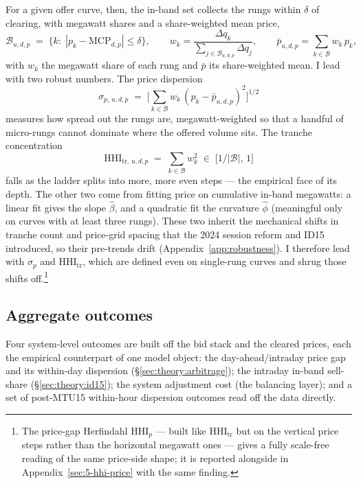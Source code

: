 \documentclass[11pt,a4paper]{article}
\theoremstyle{definition}
\theoremstyle{remark}
\theoremstyle{plain}
\begin{document}
For a given offer curve, then, the in-band set collects the rungs within $\delta$ of clearing, with megawatt shares and a share-weighted mean price,
\[
\mathcal{B}_{u,d,p} \;=\; \bigl\{k:\;|p_k - \text{MCP}_{d,p}| \le \delta\bigr\}, \qquad
w_k = \frac{\Delta q_k}{\sum_{j\in\mathcal{B}_{u,d,p}} \Delta q_j}, \qquad
\bar p_{u,d,p} = \sum_{k\in\mathcal{B}} w_k\, p_k,
\]
with $w_k$ the megawatt share of each rung and $\bar p$ its share-weighted mean. I lead with two robust numbers. The price dispersion
\[
\sigma_{p,\,u,d,p} \;=\; \Big[\sum_{k\in\mathcal{B}} w_k \,(p_k - \bar p_{u,d,p})^2\Big]^{1/2}
\]
measures how spread out the rungs are, megawatt-weighted so that a handful of micro-rungs cannot dominate where the offered volume sits. The tranche concentration
\[
\text{HHI}_{\text{tr},\,u,d,p} \;=\; \sum_{k\in\mathcal{B}} w_k^2 \;\in\; \big[1/|\mathcal{B}|,\,1\big]
\]
falls as the ladder splits into more, more even steps --- the empirical face of its depth. The other two come from fitting price on cumulative in-band megawatts: a linear fit gives the slope $\hat\beta$, and a quadratic fit the curvature $\hat\phi$ (meaningful only on curves with at least three rungs). These two inherit the mechanical shifts in tranche count and price-grid spacing that the 2024 session reform and ID15 introduced, so their pre-trends drift (Appendix~\ref{app:robustness}). I therefore lead with $\sigma_p$ and $\text{HHI}_{\text{tr}}$, which are defined even on single-rung curves and shrug those shifts off.\footnote{The price-gap Herfindahl $\text{HHI}_p$ --- built like $\text{HHI}_{\text{tr}}$ but on the vertical price steps rather than the horizontal megawatt ones --- gives a fully scale-free reading of the same price-side shape; it is reported alongside in Appendix~\ref{sec:5-hhi-price} with the same finding.}

\subsection{Aggregate outcomes}\label{sec:data:aggregate}

Four system-level outcomes are built off the bid stack and the cleared prices, each the empirical counterpart of one model object: the day-ahead/intraday price gap and its within-day dispersion (\S\ref{sec:theory:arbitrage}); the intraday in-band sell-share (\S\ref{sec:theory:id15}); the system adjustment cost (the balancing layer); and a set of post-MTU15 within-hour dispersion outcomes read off the data directly.
\end{document}
